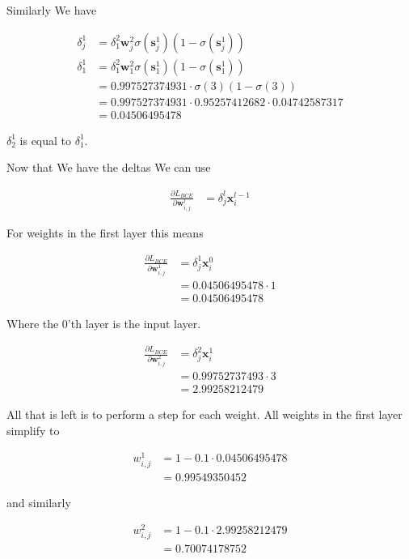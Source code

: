 \documentclass{article}
\begin{document}
	 Similarly We have
	 
	 \begin{align}
	 	\delta^1_j &=   \delta^2_1 \mathbf{w}^2_j \sigma(\mathbf{s}^{1}_j)(1-\sigma(\mathbf{s}^{1}_j))\\
	 	\delta^1_1 &=   \delta^2_1 \mathbf{w}^2_1 \sigma(\mathbf{s}^{1}_1)(1-\sigma(\mathbf{s}^{1}_1))\\
	 	&=   0.997527374931\cdot  \sigma(3)(1-\sigma(3))\\
	 	&=   0.997527374931\cdot  0.95257412682 \cdot 0.04742587317\\
	 	&= 0.04506495478
	 \end{align}
	 
	 $\delta^1_2$ is equal to $\delta^1_1$. 
	 
	 Now that We have the deltas We can use

	\begin{align}
	 	\frac{\partial L_{BCE}}{\partial \mathbf{w}^l_{i, j}} &= \delta^l_j\mathbf{x}^{l-1}_i
	 \end{align}
	 
	 For weights in the first layer this means

	\begin{align}
	 	\frac{\partial L_{BCE}}{\partial \mathbf{w}^1_{i, j}} &= \delta^1_j\mathbf{x}^{0}_i\\
	 	&= 0.04506495478\cdot 1\\
	 	&= 0.04506495478
	 \end{align}
	 
	 Where the 0'th layer is the input layer. 

	\begin{align}
	 	\frac{\partial L_{BCE}}{\partial \mathbf{w}^2_{i, j}} &= \delta^2_j\mathbf{x}^{1}_i\\
	 	&= 0.99752737493\cdot 3\\
	 	&= 2.99258212479
	 \end{align}
	 
	 All that is left is to perform a step for each weight. All weights in the first layer simplify to 
	 
	 \begin{align}
	 	w^1_{i, j} &= 1 - 0.1\cdot 0.04506495478\\
	 	&= 0.99549350452
	 \end{align}
	 
	 and similarly
	 
	  \begin{align}
	 	w^2_{i, j} &= 1 - 0.1\cdot 2.99258212479\\
	 	&= 0.70074178752
	 \end{align}
	 
\end{document}
